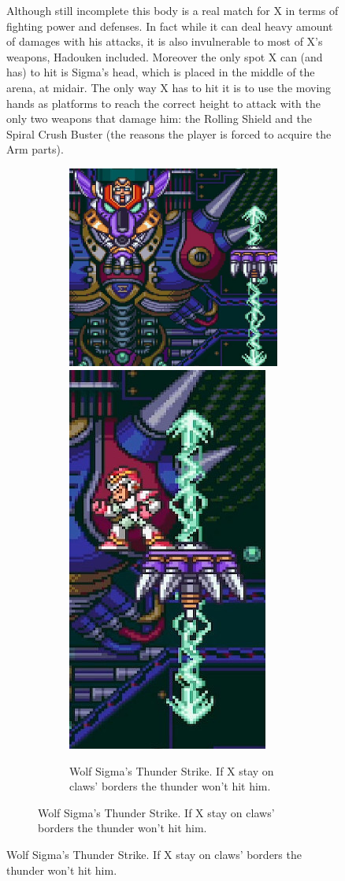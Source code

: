 \begin{figure}[htp]
Although still incomplete this body is a real match for X in terms of fighting power and defenses. In fact while it can deal heavy amount of damages with his attacks, it is also invulnerable to most of X's weapons, Hadouken included. Moreover the only spot X can (and has) to hit is Sigma's head, which is placed in the middle of the arena, at midair. The only way X has to hit it is to use the moving hands as platforms to reach the correct height to attack with the only two weapons that damage him: the Rolling Shield and the Spiral Crush Buster (the reasons the player is forced to acquire the Arm parts).
\begin{figure}[htp]
	\centering
	\begin{subfigure}{0.85\linewidth}
		\centering
		\includegraphics[width=0.65\linewidth]{figures/X1/Sigma_stages/WolfSigma_thunder.jpg}
		\includegraphics[width=0.32\linewidth]{figures/X1/Sigma_stages/WolfSigma_thunder_2.jpg}
		\caption{Wolf Sigma's Thunder Strike. If X stay on claws' borders the thunder won't hit him.}

\end{subfigure}
\end{figure}
\end{figure}
